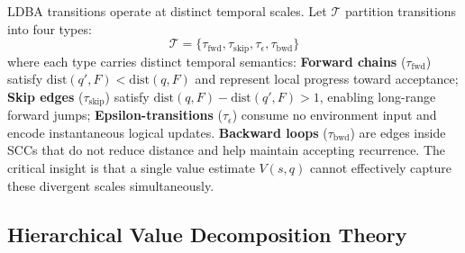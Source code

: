 \documentclass[journal]{IEEEtran}
\begin{document}
LDBA transitions operate at distinct temporal scales. Let $\mathcal{T}$ partition transitions into four types:
\begin{equation}
\mathcal{T} = \{\tau_{\text{fwd}}, \tau_{\text{skip}}, \tau_{\epsilon}, \tau_{\text{bwd}}\}
\label{eq:transition_types}
\end{equation}
where each type carries distinct temporal semantics: \textbf{Forward chains} ($\tau_{\text{fwd}}$) satisfy $\text{dist}(q', F) < \text{dist}(q, F)$ and represent local progress toward acceptance; \textbf{Skip edges} ($\tau_{\text{skip}}$) satisfy $\text{dist}(q, F) - \text{dist}(q', F) > 1$, enabling long-range forward jumps; \textbf{Epsilon-transitions} ($\tau_{\epsilon}$) consume no environment input and encode instantaneous logical updates. \textbf{Backward loops} ($\tau_{\text{bwd}}$) are edges inside SCCs that do not reduce distance and help maintain accepting recurrence. The critical insight is that a single value estimate $V(s, q)$ cannot effectively capture these divergent scales simultaneously.

\subsection{Hierarchical Value Decomposition Theory}
\end{document}
